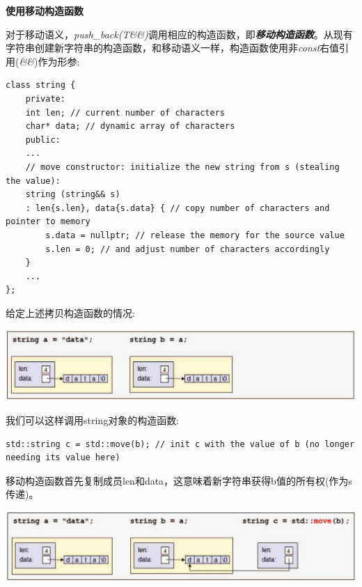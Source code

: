 \hspace*{\fill} \par %
\textbf{使用移动构造函数}

对于移动语义，\textit{push\_back(T\&\&)}调用相应的构造函数，即\textit{\textbf{移动构造函数}}。从现有字符串创建新字符串的构造函数，和移动语义一样，构造函数使用非\textit{const}右值引用(\textit{\&\&})作为形参:\par

\begin{lstlisting}[caption={}]
class string {
	private:
	int len; // current number of characters
	char* data; // dynamic array of characters
	public:
	...
	// move constructor: initialize the new string from s (stealing the value):
	string (string&& s)
	: len{s.len}, data{s.data} { // copy number of characters and pointer to memory
		s.data = nullptr; // release the memory for the source value
		s.len = 0; // and adjust number of characters accordingly
	}
	...
};
\end{lstlisting}

给定上述拷贝构造函数的情况:\par

\begin{center}
	\includegraphics[width=1.0\textwidth]{content/1/chapter1/images/20}
\end{center}

我们可以这样调用string对象的构造函数:\par

\begin{lstlisting}[caption={}]
std::string c = std::move(b); // init c with the value of b (no longer needing its value here)
\end{lstlisting}

移动构造函数首先复制成员len和data，这意味着新字符串获得b值的所有权(作为s传递)。\par

\begin{center}
	\includegraphics[width=1.0\textwidth]{content/1/chapter1/images/21}
\end{center}

